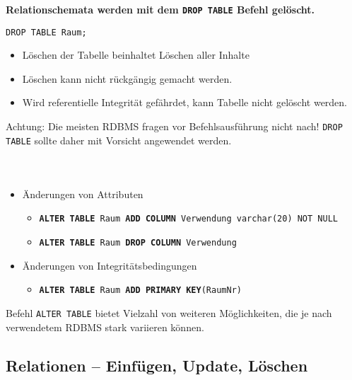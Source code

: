 \begin{frame}[fragile]\frametitle{\insertsection}
	\framesubtitle{\insertsubsection}
\textbf{Relationschemata werden mit dem \texttt{DROP TABLE} Befehl gelöscht.}\\[4pt]
\begin{lstlisting}[xleftmargin=3ex,numbers=none]
DROP TABLE Raum;
\end{lstlisting}
\abs
\begin{itemize}
	\item L\"oschen der Tabelle beinhaltet L\"oschen aller Inhalte
	\item L\"oschen kann nicht r\"uckg\"angig gemacht werden. 
	\item Wird referentielle Integrit\"at gef\"ahrdet, kann Tabelle nicht gel\"oscht werden.	
\end{itemize}
\abs
\alert{Achtung: Die meisten RDBMS fragen vor Befehlsausführung nicht nach! 
 \texttt{DROP TABLE} sollte daher mit Vorsicht angewendet werden.}
\end{frame}

\begin{frame}[fragile]\frametitle{\insertsection}
	\framesubtitle{\insertsubsection}
	\\[4pt]
\begin{itemize}
	\item Änderungen von Attributen
	\begin{itemize}
		\item \texttt{\textbf{ALTER TABLE} Raum \textbf{ADD COLUMN} Verwendung varchar(20) NOT NULL}
		\item \texttt{\textbf{ALTER TABLE} Raum \textbf{DROP COLUMN} Verwendung}\\[4pt]
	\end{itemize}
	\item Änderungen von Integritätsbedingungen
	\begin{itemize}
		\item \texttt{\textbf{ALTER TABLE} Raum \textbf{ADD PRIMARY KEY}(RaumNr)}
	\end{itemize}
\end{itemize}
\abs
Befehl \texttt{ALTER TABLE} bietet Vielzahl von weiteren M\"oglichkeiten, die je nach 
verwendetem RDBMS stark variieren k\"onnen.
\end{frame}

\subsection{Relationen -- Einf\"ugen, Update, L\"oschen}

